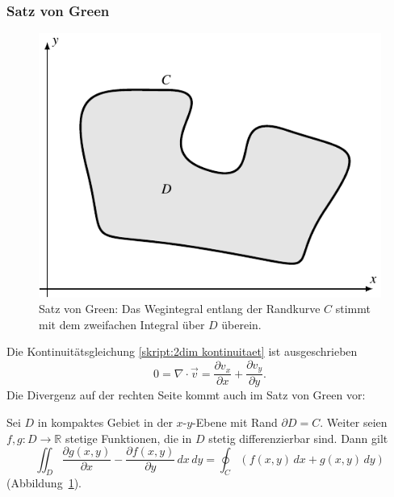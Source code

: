 \subsubsection{Satz von Green}
\begin{figure}
\centering
\includegraphics{chapters/2/green-curve.pdf}
\caption{Satz von Green: Das Wegintegral entlang der Randkurve $C$
stimmt mit dem zweifachen Integral über $D$ überein.
\label{skript:green-kurve}}
\end{figure}
Die Kontinuitätsgleichung 
\eqref{skript:2dim kontinuitaet}
ist ausgeschrieben
\[
0
=
\nabla\cdot\vec v
=
\frac{\partial v_x}{\partial x} + \frac{\partial v_y}{\partial y}.
\]
Die Divergenz auf der rechten Seite kommt auch im Satz von Green
vor:

\begin{satz}[Green]
\label{skript:2dim green}
Sei $D$ in kompaktes Gebiet in der $x$-$y$-Ebene mit Rand $\partial D=C$.
Weiter seien $f,g\colon D\to\mathbb R$ stetige Funktionen, die in $D$ 
stetig differenzierbar sind.
Dann gilt
\begin{equation}
\iint_{D}
\frac{\partial g(x,y)}{\partial x}
-
\frac{\partial f(x,y)}{\partial y}\,dx\,dy
=
\oint_C (f(x,y)\,dx + g(x,y)\,dy)
\label{skript:green formel}
\end{equation}
(Abbildung~\ref{skript:green-kurve}).
\end{satz}

